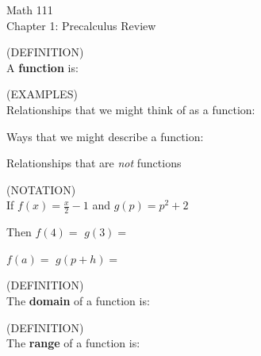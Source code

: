 \documentclass[11pt]{article}
\begin{document}
\begin{center}
\Large
\rm{Math 111}
\\
\rm{Chapter 1:  Precalculus Review}
\\
\end{center}
\vspace{0.2in}

(DEFINITION)\\

A {\bf function} is:

\vspace{0.5in}

(EXAMPLES)\\

Relationships that we might think of as a function:

\vspace{0.5in}

Ways that we might describe a function:

\vspace{1.5in}

Relationships that are \emph{not} functions

\vspace{1.5in}

(NOTATION)\\

If $f(x) = \frac{x}{2}-1$ and  $g(p) = p^2+2$\\

\vspace{0.5in}

Then $f(4) = $ \hspace{3in} $g(3) = $\\

\vspace{0.5in}

$f(a) = $ \hspace{3in} $g(p+h) = $\\


\vspace{1.5in}

(DEFINITION)\\

The {\bf domain} of a function is:

\vspace{0.5in}

(DEFINITION)\\

The {\bf range} of a function is:

\vspace{0.5in}
\end{document}
